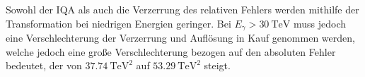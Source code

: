 Sowohl der IQA als auch die Verzerrung des relativen Fehlers werden mithilfe der Transformation bei niedrigen Energien geringer.
Bei $E_\gamma > \SI{30}{\tera\eV}$ muss jedoch eine Verschlechterung der Verzerrung und Auflösung in Kauf genommen werden, welche jedoch eine große Verschlechterung
bezogen auf den absoluten Fehler bedeutet, der von $\SI{37.74}{\tera\eV\squared}$ auf $\SI{53.29}{\tera\eV\squared}$ steigt.
